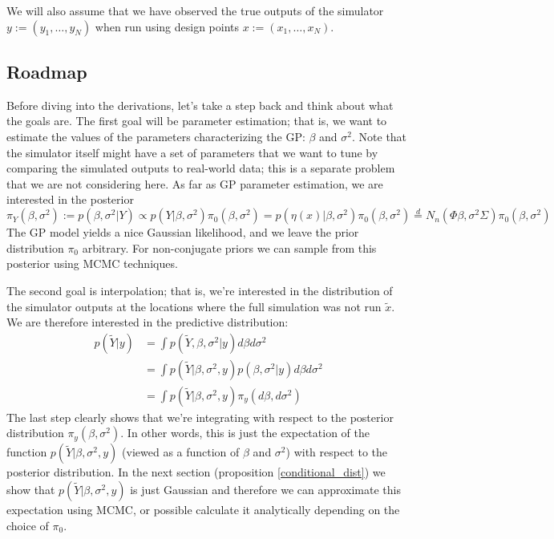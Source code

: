 \documentclass[12pt]{article}
\begin{document}
We will also assume that we have observed the true outputs of the simulator $y := (y_1, \dots, y_N)$ when run using design points $x := (x_1, \dots, x_N)$.

\subsection{Roadmap}
Before diving into the derivations, let's take a step back and think about what the goals are. The first goal will be parameter estimation; that is, we want to estimate the values of 
the parameters characterizing the GP: $\beta$ and $\sigma^2$. Note that the simulator itself might have a set of parameters that we want to tune by comparing the simulated outputs 
to real-world data; this is a separate problem that we are not considering here. As far as GP parameter estimation, we are interested in the posterior 
\[\pi_Y(\beta, \sigma^2) := p(\beta, \sigma^2|Y) \propto p(Y|\beta, \sigma^2)\pi_0(\beta, \sigma^2) = p(\eta(x)|\beta, \sigma^2)\pi_0(\beta, \sigma^2) \overset{d}{=} N_n(\Phi \beta, \sigma^2 \Sigma)\pi_0(\beta, \sigma^2) \]
The GP model yields a nice Gaussian likelihood, and we leave the prior distribution $\pi_0$ arbitrary. For non-conjugate priors we can 
sample from this posterior using MCMC techniques. 

The second goal is interpolation; that is, we're interested in the distribution of the simulator outputs at the locations where the full simulation was not run $\tilde{x}$. We are therefore interested in 
the predictive distribution: 
\begin{align*}
p(\tilde{Y}|y) &= \int p(\tilde{Y}, \beta, \sigma^2|y) d\beta d\sigma^2 \\
		    &= \int p(\tilde{Y}|\beta, \sigma^2, y)p(\beta, \sigma^2|y) d\beta d\sigma^2 \\
		    &= \int p(\tilde{Y}|\beta, \sigma^2, y) \pi_y(d\beta, d\sigma^2)
\end{align*}
The last step clearly shows that we're integrating with respect to the posterior distribution $\pi_y(\beta, \sigma^2)$. In other words, this is just the expectation of the function
$p(\tilde{Y}|\beta, \sigma^2, y)$ (viewed as a function of $\beta$ and $\sigma^2$) with respect to the posterior distribution. In the next section (proposition \ref{conditional_dist})
we show that $p(\tilde{Y}|\beta, \sigma^2, y)$ is just Gaussian and therefore we can approximate this expectation using MCMC, or possible calculate it analytically depending on the 
choice of $\pi_0$. 
\end{document}
